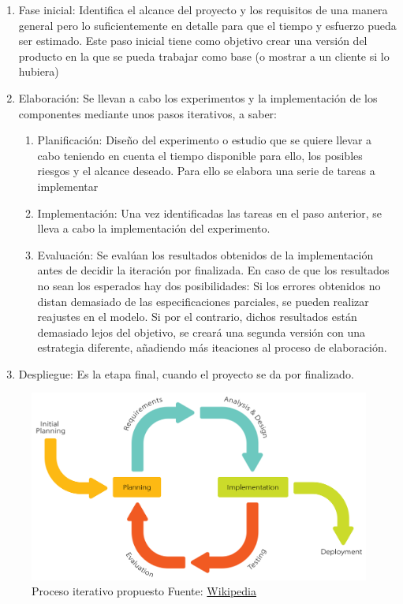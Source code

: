 \documentclass[11pt,a4paper,spanish]{book}
\begin{document}
	\begin{enumerate}
		\item Fase inicial: Identifica el alcance del proyecto y los requisitos de una manera general pero lo suficientemente en detalle para que el tiempo y esfuerzo pueda ser estimado. Este paso inicial tiene como objetivo crear una versión del producto en la que se pueda trabajar como base (o mostrar a un cliente si lo hubiera)
		
		\item Elaboración: Se llevan a cabo los experimentos y la implementación de los componentes mediante unos pasos iterativos, a saber:
		
			\begin{enumerate}
				\item Planificación: Diseño del experimento o estudio que se quiere llevar a cabo teniendo en cuenta el tiempo disponible para ello, los posibles riesgos y el alcance deseado. Para ello se elabora una serie de tareas a implementar
				
				\item Implementación: Una vez identificadas las tareas en el paso anterior, se lleva a cabo la implementación del experimento.
				
				\item Evaluación: Se evalúan los resultados obtenidos de la implementación antes de decidir la iteración por finalizada. En caso de que los resultados no sean los esperados hay dos posibilidades: Si los errores obtenidos no distan demasiado de las especificaciones parciales, se pueden realizar reajustes en el modelo. Si por el contrario, dichos resultados están demasiado lejos del objetivo, se creará una segunda versión con una estrategia diferente, añadiendo más iteaciones al proceso de elaboración.
			\end{enumerate} 
		
		\item Despliegue: Es la etapa final, cuando el proyecto se da por finalizado.
	\end{enumerate}


	\begin{figure}[H]
		\centering
		\includegraphics[scale=0.15]{Iterative_Process_Diagram.png}
		\caption{Proceso iterativo propuesto Fuente: \href{https://en.wikipedia.org/wiki/Iterative_and_incremental_development}{Wikipedia}}
		\label{fig:iterative_process}
	\end{figure}
\end{document}
